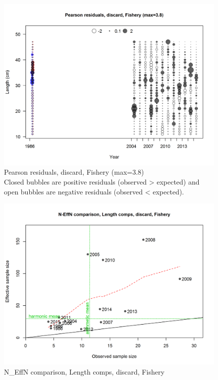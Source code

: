 \documentclass[12pt,]{article}
\begin{document}
\begin{figure}
\centering
\includegraphics{./r4ss/plots_mod1/comp_lenfit_residsflt1mkt1.png}
\caption{Pearson residuals, discard, Fishery (max=3.8)\\
Closed bubbles are positive residuals (observed \textgreater{} expected)
and open bubbles are negative residuals (observed \textless{} expected).
\label{fig:mod1_2_comp_lenfit_residsflt1mkt1}}
\end{figure}

\begin{figure}
\centering
\includegraphics{./r4ss/plots_mod1/comp_lenfit_sampsize_flt1mkt1.png}
\caption{N\_EffN comparison, Length comps, discard, Fishery
\label{fig:mod1_3_comp_lenfit_sampsize_flt1mkt1}}
\end{figure}
\end{document}
